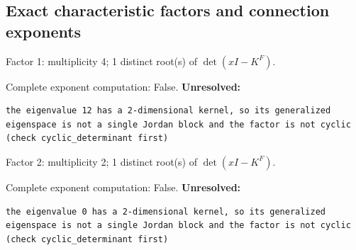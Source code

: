 \documentclass[10pt,a4paper]{article}
\newcommand{\fitmath}[1]{\sbox{\mathbox}{$\displaystyle #1$}\ifdim\wd\mathbox>\linewidth\resizebox{\linewidth}{!}{\usebox{\mathbox}}\else\usebox{\mathbox}\fi}
\begin{document}
\subsection*{Exact characteristic factors and connection exponents}
Factor 1: multiplicity 4; 1 distinct root(s) of $\det(xI-K^F)$.
\begin{center}\fitmath{\begin{aligned}p_{1}(x)&=x - 12\end{aligned}}\end{center}
Complete exponent computation: False.
\textbf{Unresolved:}

\begin{lstlisting}
the eigenvalue 12 has a 2-dimensional kernel, so its generalized eigenspace is not a single Jordan block and the factor is not cyclic (check cyclic_determinant first)
\end{lstlisting}

Factor 2: multiplicity 2; 1 distinct root(s) of $\det(xI-K^F)$.
\begin{center}\fitmath{\begin{aligned}p_{2}(x)&=x\end{aligned}}\end{center}
Complete exponent computation: False.
\textbf{Unresolved:}

\begin{lstlisting}
the eigenvalue 0 has a 2-dimensional kernel, so its generalized eigenspace is not a single Jordan block and the factor is not cyclic (check cyclic_determinant first)
\end{lstlisting}
\end{document}
